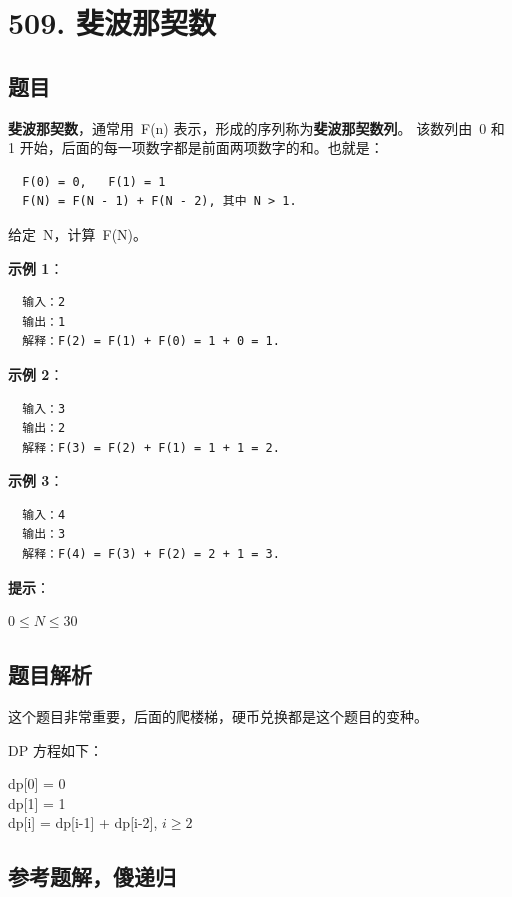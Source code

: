 \newpage
\section{509. 斐波那契数}
\label{leetcode:509}

\subsection{题目}

\textbf{斐波那契数}，通常用 F(n) 表示，形成的序列称为\textbf{斐波那契数列}。
该数列由 0 和 1 开始，后面的每一项数字都是前面两项数字的和。也就是：

\begin{verbatim}
  F(0) = 0,   F(1) = 1
  F(N) = F(N - 1) + F(N - 2), 其中 N > 1.
\end{verbatim}

给定 N，计算 F(N)。

\textbf{示例 1}：

\begin{verbatim}
  输入：2
  输出：1
  解释：F(2) = F(1) + F(0) = 1 + 0 = 1.
\end{verbatim}

\textbf{示例 2}：

\begin{verbatim}
  输入：3
  输出：2
  解释：F(3) = F(2) + F(1) = 1 + 1 = 2.
\end{verbatim}

\textbf{示例 3}：

\begin{verbatim}
  输入：4
  输出：3
  解释：F(4) = F(3) + F(2) = 2 + 1 = 3.
\end{verbatim}

\textbf{提示}：

  $0 \leq N \leq 30$

\subsection{题目解析}

这个题目非常重要，后面的爬楼梯，硬币兑换都是这个题目的变种。

DP 方程如下：

  dp[0] = 0 \\
  dp[1] = 1 \\
  dp[i] = dp[i-1] + dp[i-2], $i \geq 2$

\subsection{参考题解，傻递归}

